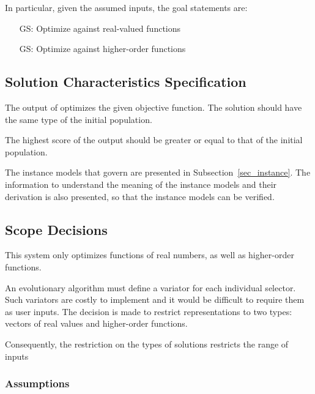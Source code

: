 \documentclass[12pt]{article}
\newcounter{goalnum} %
\begin{document}
\noindent In particular, given the assumed inputs, the goal statements are:

\begin{itemize}

\item[GS\refstepcounter{goalnum}\thegoalnum \label{GS_REALS}:] Optimize against real-valued functions
\item[GS\refstepcounter{goalnum}\thegoalnum \label{GS_HIGHER}:] Optimize against higher-order functions
\end{itemize}

\subsection{Solution Characteristics Specification}
\label{subsec:solchar}

The output of \thisproject{} optimizes the given objective function. The solution should have the same type of the initial population.

The highest score of the output should be greater or equal to that of the initial population.


The instance models that govern \progname{} are presented in
Subsection~\ref{sec_instance}.  The information to understand the meaning of the
instance models and their derivation is also presented, so that the instance
models can be verified.

\subsection{Scope Decisions}
\label{subsec:scope}

This system only optimizes functions of real numbers, as well as higher-order functions.

An evolutionary algorithm must define a variator for each individual selector. Such variators are costly to implement and it would be difficult to require them as user inputs. The decision is made to restrict representations to two types: vectors of real values and higher-order functions. 

Consequently, the restriction on the types of solutions restricts the range of inputs


\subsubsection{Assumptions} \label{sec_assumpt}
\end{document}
